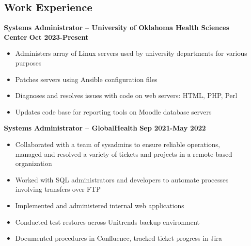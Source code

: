 \documentclass[line]{res}
\begin{document}

\address{Oklahoma City, OK $\parallel$ trjean.ou@gmail.com $\parallel$ (580) 304-6896}

\begin{resume}

\section{Work Experience}

\textbf{Systems Administrator -- University of Oklahoma Health Sciences Center}
\newline
\textbf{Oct 2023-Present}
	\begin{itemize}
	\item Administers array of Linux servers used by university departments for various purposes
	\item Patches servers using Ansible configuration files
	\item Diagnoses and resolves issues with code on web servers: HTML, PHP, Perl
	\item Updates code base for reporting tools on Moodle database servers
	\end{itemize}

\textbf{Systems Administrator -- GlobalHealth}
\newline
\textbf{Sep 2021-May 2022}
\begin{itemize}
	\item Collaborated with a team of sysadmins to ensure reliable operations, managed and resolved a variety of tickets and projects in a remote-based organization
	\item Worked with SQL administrators and developers to automate processes involving transfers over FTP
	\item Implemented and administered internal web applications
	\item Conducted test restores across Unitrends backup environment
	\item Documented procedures in Confluence, tracked ticket progress in Jira 
\end{itemize}


\end{resume}
\end{document}
